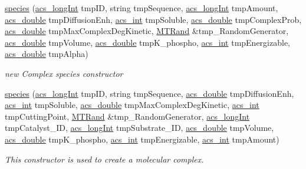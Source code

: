 \begin{DoxyCompactItemize}
\hyperlink{a00022_aaf94a268983e0589709e82991a2544da}{species} (\hyperlink{a00024_a19319d75f02db4308bc5c0026d98cd85}{acs\-\_\-long\-Int} tmp\-I\-D, string tmp\-Sequence, \hyperlink{a00024_a19319d75f02db4308bc5c0026d98cd85}{acs\-\_\-long\-Int} tmp\-Amount, \hyperlink{a00024_ab776853a005fcbf56af0424a2a4dd607}{acs\-\_\-double} tmp\-Diffusion\-Enh, \hyperlink{a00024_a8d277355641a098190360234e2ebde35}{acs\-\_\-int} tmp\-Soluble, \hyperlink{a00024_ab776853a005fcbf56af0424a2a4dd607}{acs\-\_\-double} tmp\-Complex\-Prob, \hyperlink{a00024_ab776853a005fcbf56af0424a2a4dd607}{acs\-\_\-double} tmp\-Max\-Complex\-Deg\-Kinetic, \hyperlink{a00016}{M\-T\-Rand} \&tmp\-\_\-\-Random\-Generator, \hyperlink{a00024_ab776853a005fcbf56af0424a2a4dd607}{acs\-\_\-double} tmp\-Volume, \hyperlink{a00024_ab776853a005fcbf56af0424a2a4dd607}{acs\-\_\-double} tmp\-K\-\_\-phospho, \hyperlink{a00024_a8d277355641a098190360234e2ebde35}{acs\-\_\-int} tmp\-Energizable, \hyperlink{a00024_ab776853a005fcbf56af0424a2a4dd607}{acs\-\_\-double} tmp\-Alpha)
\begin{DoxyCompactList}\small\item\em new Complex species constructor \end{DoxyCompactList}\item 
\hyperlink{a00022_a492478eb509138dff0be715a70d741ac}{species} (\hyperlink{a00024_a19319d75f02db4308bc5c0026d98cd85}{acs\-\_\-long\-Int} tmp\-I\-D, string tmp\-Sequence, \hyperlink{a00024_ab776853a005fcbf56af0424a2a4dd607}{acs\-\_\-double} tmp\-Diffusion\-Enh, \hyperlink{a00024_a8d277355641a098190360234e2ebde35}{acs\-\_\-int} tmp\-Soluble, \hyperlink{a00024_ab776853a005fcbf56af0424a2a4dd607}{acs\-\_\-double} tmp\-Max\-Complex\-Deg\-Kinetic, \hyperlink{a00024_a8d277355641a098190360234e2ebde35}{acs\-\_\-int} tmp\-Cutting\-Point, \hyperlink{a00016}{M\-T\-Rand} \&tmp\-\_\-\-Random\-Generator, \hyperlink{a00024_a19319d75f02db4308bc5c0026d98cd85}{acs\-\_\-long\-Int} tmp\-Catalyst\-\_\-\-I\-D, \hyperlink{a00024_a19319d75f02db4308bc5c0026d98cd85}{acs\-\_\-long\-Int} tmp\-Substrate\-\_\-\-I\-D, \hyperlink{a00024_ab776853a005fcbf56af0424a2a4dd607}{acs\-\_\-double} tmp\-Volume, \hyperlink{a00024_ab776853a005fcbf56af0424a2a4dd607}{acs\-\_\-double} tmp\-K\-\_\-phospho, \hyperlink{a00024_a8d277355641a098190360234e2ebde35}{acs\-\_\-int} tmp\-Energizable, \hyperlink{a00024_a8d277355641a098190360234e2ebde35}{acs\-\_\-int} tmp\-Amount)
\begin{DoxyCompactList}\small\item\em This constructor is used to create a molecular complex. \end{DoxyCompactList}\item 

\end{DoxyCompactItemize}
